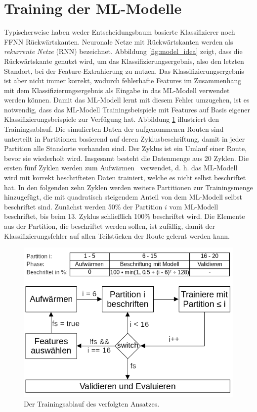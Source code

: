 \section{Training der ML-Modelle}
\label{sec:model_training}
Typischerweise haben weder Entscheidungsbaum basierte Klassifizierer noch FFNN Rückwärtskanten.
Neuronale Netze mit Rückwärtskanten werden als \textit{rekurrente Netze} (RNN) bezeichnet.
Abbildung \ref{fig:model_idea} zeigt, dass die Rückwärtskante genutzt wird, um das Klassifizierungsergebnis,
also den letzten Standort, bei der Feature-Extrahierung zu nutzen.
Das Klassifizierungsergebnis ist aber nicht immer korrekt, wodurch fehlerhafte Features im Zusammenhang
mit dem Klassifizierungsergebnis als Eingabe in das ML-Modell verwendet werden können.
Damit das ML-Modell lernt mit diesem Fehler umzugehen, ist es notwendig, dass das ML-Modell Trainingsbeispiele mit
Features auf Basis eigener Klassifizierungsbeispiele zur Verfügung hat.
\newline
\newline
Abbildung \ref{fig:training_explained} illustriert den Trainingsablauf.
Die simulierten Daten der aufgenommenen Routen sind unterteilt in Partitionen basierend auf deren Zyklusbeschriftung,
damit in jeder Partition alle Standorte vorhanden sind.
Der Zyklus ist ein Umlauf einer Route, bevor sie wiederholt wird.
Insgesamt besteht die Datenmenge aus 20 Zyklen.
Die ersten fünf Zyklen werden zum \glqq Aufwärmen \grqq\ verwendet,
d. h. das ML-Modell wird mit korrekt beschrifteten Daten trainiert, welche es nicht selbst beschriftet hat.
In den folgenden zehn Zyklen werden weitere Partitionen zur Trainingsmenge hinzugefügt, die mit quadratisch steigendem Anteil von dem ML-Modell selbst beschriftet sind.
Zunächst werden 50\% der Partition $i$ vom ML-Modell beschriftet, bis beim 13. Zyklus schließlich 100\% beschriftet wird.
Die Elemente aus der Partition, die beschriftet werden sollen, ist zufällig, damit der Klassifizierungsfehler auf allen Teilstücken der Route gelernt werden kann.
\begin{figure}[h!]
    \centering
    \includegraphics[width=\linewidth]{images/training_explained.png}
    \caption{Der Trainingsablauf des verfolgten Ansatzes.}
    \label{fig:training_explained}
\end{figure}
